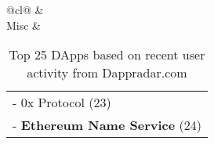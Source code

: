 \begin{table}[]
\begin{tabular}{@{}cl@{}}
                                        &                                                                                                                                                                     \\ \midrule
Misc                                                                                                 & \begin{tabular}[c]{@{}l@{}}- 0x Protocol (23)\\ - \textbf{Ethereum Name Service} (24)\end{tabular}                                                                                                                                             \\ \bottomrule
\end{tabular} 
  \caption{Top 25 DApps based on recent user activity from Dappradar.com}         \label{tab:top25dapps}                        
\end{table}